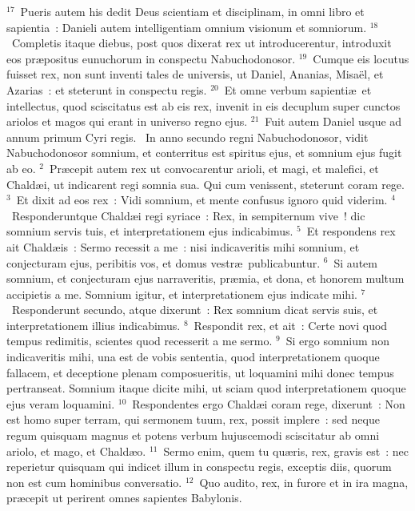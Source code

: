 ${}^{17}$~Pueris autem his dedit Deus scientiam et disciplinam, in omni libro et sapientia~: Danieli autem intelligentiam omnium visionum et somniorum.
${}^{18}$~Completis itaque diebus, post quos dixerat rex ut introducerentur, introduxit eos pr\ae positus eunuchorum in conspectu Nabuchodonosor.
${}^{19}$~Cumque eis locutus fuisset rex, non sunt inventi tales de universis, ut Daniel, Ananias, Misa\"el, et Azarias~: et steterunt in conspectu regis.
${}^{20}$~Et omne verbum sapienti\ae\ et intellectus, quod sciscitatus est ab eis rex, invenit in eis decuplum super cunctos ariolos et magos qui erant in universo regno ejus.
${}^{21}$~Fuit autem Daniel usque ad annum primum Cyri regis.
~\lettrine[lines=10,image=true,loversize=0.05,lraise=-0.03]{I}{}n anno secundo regni Nabuchodonosor, vidit Nabuchodonosor somnium, et conterritus est spiritus ejus, et somnium ejus fugit ab eo.
${}^{2}$~Pr\ae cepit autem rex ut convocarentur arioli, et magi, et malefici, et Chald\ae i, ut indicarent regi somnia sua. Qui cum venissent, steterunt coram rege.
${}^{3}$~Et dixit ad eos rex~: Vidi somnium, et mente confusus ignoro quid viderim.
${}^{4}$~Responderuntque Chald\ae i regi syriace~: Rex, in sempiternum vive~! dic somnium servis tuis, et interpretationem ejus indicabimus.
${}^{5}$~Et respondens rex ait Chald\ae is~: Sermo recessit a me~: nisi indicaveritis mihi somnium, et conjecturam ejus, peribitis vos, et domus vestr\ae\ publicabuntur.
${}^{6}$~Si autem somnium, et conjecturam ejus narraveritis, pr\ae mia, et dona, et honorem multum accipietis a me. Somnium igitur, et interpretationem ejus indicate mihi.
${}^{7}$~Responderunt secundo, atque dixerunt~: Rex somnium dicat servis suis, et interpretationem illius indicabimus.
${}^{8}$~Respondit rex, et ait~: Certe novi quod tempus redimitis, scientes quod recesserit a me sermo.
${}^{9}$~Si ergo somnium non indicaveritis mihi, una est de vobis sententia, quod interpretationem quoque fallacem, et deceptione plenam composueritis, ut loquamini mihi donec tempus pertranseat. Somnium itaque dicite mihi, ut sciam quod interpretationem quoque ejus veram loquamini.
${}^{10}$~Respondentes ergo Chald\ae i coram rege, dixerunt~: Non est homo super terram, qui sermonem tuum, rex, possit implere~: sed neque regum quisquam magnus et potens verbum hujuscemodi sciscitatur ab omni ariolo, et mago, et Chald\ae o.
${}^{11}$~Sermo enim, quem tu qu\ae ris, rex, gravis est~: nec reperietur quisquam qui indicet illum in conspectu regis, exceptis diis, quorum non est cum hominibus conversatio.
${}^{12}$~Quo audito, rex, in furore et in ira magna, pr\ae cepit ut perirent omnes sapientes Babylonis.

